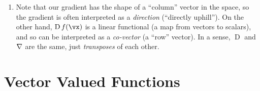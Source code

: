\documentclass[11pt, oneside]{amsart}
\newcommand{\opD}{\operatorname{D}}
\begin{document}
\begin{enumerate}
\item Note that our gradient has the shape of a ``column'' vector in the
space, so the gradient is often interpreted as a \emph{direction}
(``directly uphill''). On the other hand, $\opD f(\vx)$ is a linear
functional (a map from vectors to scalars), and so can be interpreted as
a \emph{co-vector} (a ``row'' vector). In a sense, $\opD$ and
$\nabla$ are the same, just \emph{transposes} of each other.






\end{enumerate}

\section{Vector Valued Functions}
\end{document}
